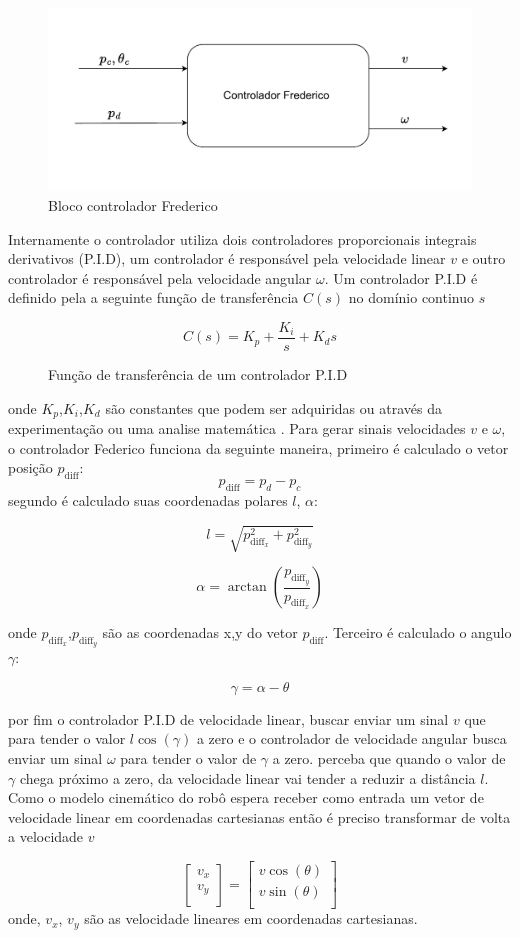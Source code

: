 \begin{figure}[H]
    \centering
    \includegraphics[scale=0.8]{figuras/controlador_frederico.pdf}
    \caption{Bloco controlador Frederico}
\end{figure}

Internamente o controlador utiliza  dois controladores proporcionais
integrais derivativos (P.I.D), um controlador é responsável pela velocidade linear $v$
e outro controlador é responsável pela velocidade angular $\omega$. 
Um controlador P.I.D é definido pela a seguinte função de
transferência $C(s)$ no domínio continuo $s$

\begin{figure}[H]
    \[
        C(s) = K_p + \frac{K_i}{s} + K_ds
    \]
    \caption{Função de transferência de um controlador P.I.D }
\end{figure}
onde $K_p$,$K_i$,$K_d$ são constantes que podem ser adquiridas ou
através da experimentação ou uma analise matemática \cite{ogataengenharia}. Para gerar sinais
velocidades $v$ e $\omega$,  o controlador Federico funciona da seguinte
maneira, primeiro é calculado o vetor posição $p_{\text{diff}}$:
\[
    p_{\text{diff}} = p_d - p_c 
\]
segundo é calculado suas coordenadas polares $l$, $\alpha$:

\[
    l = \sqrt{p_{\text{diff}_x}^2 + p_{\text{diff}_y}^2}
\]

\[
    \alpha =  \arctan(\frac{ p_{\text{diff}_y}}{p_{\text{diff}_x}}) 
\]

onde $p_{\text{diff}_x}$,$p_{\text{diff}_y}$ são as coordenadas x,y
do vetor $p_{\text{diff}}$. Terceiro é calculado o angulo $\gamma$:

\[
    \gamma =  \alpha - \theta
\]


por fim o controlador P.I.D de velocidade
linear, buscar enviar um sinal $v$ que para tender o valor $l \cos(\gamma)$
a zero e o controlador de velocidade angular busca enviar um sinal $\omega$
para  tender o valor de $\gamma$ a zero. perceba que quando o valor de $\gamma$
chega próximo a zero, da velocidade linear vai tender a reduzir a
distância $l$. Como o modelo cinemático do robô espera receber como entrada
um vetor de velocidade linear em coordenadas cartesianas então é preciso
transformar de volta a velocidade $v$ 

\[
    \begin{bmatrix}
        v_x \\
        v_y \\
    \end{bmatrix}
    =
    \begin{bmatrix}
        v\cos(\theta) \\
        v\sin(\theta) \\
    \end{bmatrix}
\]
onde, $v_x$, $v_y$ são as velocidade lineares em coordenadas cartesianas.